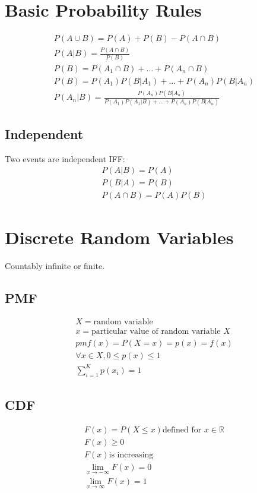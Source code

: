 \section{Basic Probability Rules}
\begin{align}
  P(A \cup B) = P(A) + P(B) - P(A \cap B) \\
  P(A | B) = \frac{P(A \cap B)}{P(B)} \\
  P(B) = P(A_1 \cap B) + \ldots + P(A_n \cap B) \\
  P(B) = P(A_1)P(B | A_1) + \ldots + P(A_n)P(B | A_n) \\
  P(A_n | B) = \frac{P(A_n)P(B | A_n)}{P(A_1)P(A_1 | B) + \ldots + P(A_n)P(B | A_n)}
\end{align}

\subsection{Independent}
Two events are independent IFF:
\begin{align}
  P(A | B) = P(A) \\
  P(B | A) = P(B) \\
  P(A \cap B) = P(A)P(B) 
\end{align}

\section{Discrete Random Variables}
Countably infinite or finite.

\subsection{PMF}
\begin{align}
  X = \text{random variable} \\
  x = \text{particular value of random variable $X$} \\
  pmf(x) = P(X = x) = p(x) = f(x) \\
  \forall x \in X, 0 \leq p(x) \leq 1 \\
  \sum_{i=1}^{K} p(x_i) = 1
\end{align}

\subsection{CDF}
\begin{align}
  F(x) = P(X \leq x) \text{defined for $x$} \in \mathbb{R} \\
  F(x) \geq 0 \\
  F(x) \text{is increasing} \\
  \lim_{x\to-\infty} F(x) = 0 \\
  \lim_{x\to\infty} F(x) = 1
\end{align}


